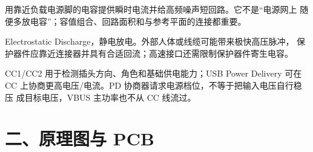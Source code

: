 \begin{description}[style=nextline,leftmargin=2.8em,labelindent=0em]
  \item[去耦 Decoupling]
  用靠近负载电源脚的电容提供瞬时电流并给高频噪声短回路。它不是“电源网上
  随便多放电容”；容值组合、回路面积和与参考平面的连接都重要。

  \item[ESD]
  Electrostatic Discharge，静电放电。外部人体或线缆可能带来极快高压脉冲，
  保护器件应靠近连接器并具有合适回流；高速接口还需限制保护器件寄生电容。

  \item[USB-C CC / Power Delivery]
  CC1/CC2 用于检测插头方向、角色和基础供电能力；USB Power Delivery 可在
  CC 上协商更高电压/电流。PD 协商器请求电源档位，不等于把输入电压自行稳压
  成目标电压，VBUS 主功率也不从 CC 线流过。
\end{description}

\section*{二、原理图与 PCB}

